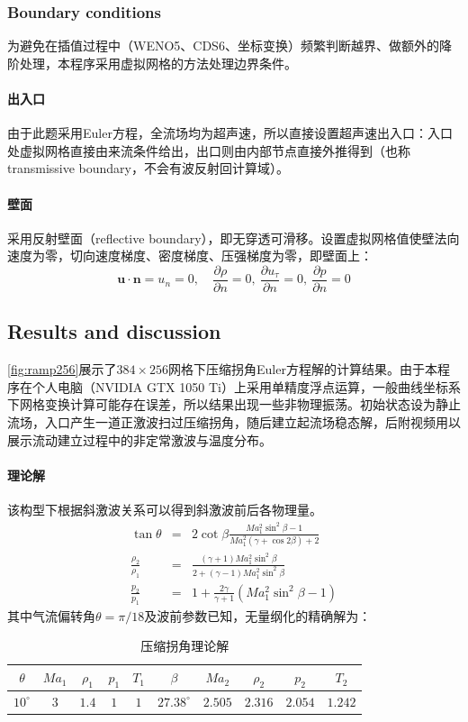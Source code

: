 \documentclass[11pt]{article}
\begin{document}
\subsubsection{Boundary conditions}
为避免在插值过程中（WENO5、CDS6、坐标变换）频繁判断越界、做额外的降阶处理，本程序采用虚拟网格的方法处理边界条件。

\paragraph{出入口}
由于此题采用Euler方程，全流场均为超声速，所以直接设置超声速出入口：入口处虚拟网格直接由来流条件给出，出口则由内部节点直接外推得到（也称transmissive boundary，不会有波反射回计算域）。

\paragraph{壁面}
采用反射壁面（reflective boundary），即无穿透可滑移。设置虚拟网格值使壁法向速度为零，切向速度梯度、密度梯度、压强梯度为零，即壁面上：
\begin{equation}
	\bm{u}\cdot \bm{n}=u_n=0,\quad \frac{\partial \rho}{\partial n}=0,\ \frac{\partial u_\tau}{\partial n}=0,\ \frac{\partial p}{\partial n}=0
\end{equation}

\subsection{Results and discussion}
\autoref{fig:ramp256}展示了$384\times256$网格下压缩拐角Euler方程解的计算结果。由于本程序在个人电脑（NVIDIA GTX 1050 Ti）上采用单精度浮点运算，一般曲线坐标系下网格变换计算可能存在误差，所以结果出现一些非物理振荡。初始状态设为静止流场，入口产生一道正激波扫过压缩拐角，随后建立起流场稳态解，后附视频用以展示流动建立过程中的非定常激波与温度分布。

\paragraph{理论解} 该构型下根据斜激波关系可以得到斜激波前后各物理量。
\begin{eqnarray}
	\tan\theta&=&2\cot\beta\frac{Ma_1^2\sin^2\beta-1}{Ma_1^2(\gamma+\cos2\beta)+2} \\
	\frac{\rho_2}{\rho_1}&=&\frac{(\gamma+1)Ma_1^2\sin^2\beta}{2+(\gamma-1)Ma_1^2\sin^2\beta} \\
	\frac{p_2}{p_1}&=&1+\frac{2\gamma}{\gamma+1}\left(Ma_1^2\sin^2\beta-1\right)
\end{eqnarray}
其中气流偏转角$\theta=\pi/18$及波前参数已知，无量纲化的精确解为：
\begin{table}[htbp]
	\centering
	\caption{\label{tab:ramp}压缩拐角理论解}\vspace{1ex}
	\begin{tabular}{cccccccccc}
		\toprule
		$\theta$   & $Ma_1$ & $\rho_1$ & $p_1$ & $T_1$ & $\beta$        & $Ma_2$  & $\rho_2$ & $p_2$   & $T_2$   \\
		\midrule
		$10^\circ$ & $3$    & $1.4$    & $1$   & $1$   & $ 27.38^\circ$ & $2.505$ & $2.316$  & $2.054$ & $1.242$ \\
		\bottomrule
	\end{tabular}
\end{table}
\end{document}
